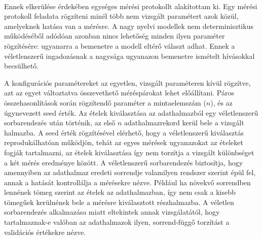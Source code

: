 \paragraph{}Ennek elkerülése érdekében egységes mérési protokollt alakítottam ki.
Egy mérési protokoll feladata rögzíteni minél több nem vizsgált paramétert azok közül,
amelyeknek hatása van a mérésre.
A nagy nyelvi modellek nem determinisztikus működéséből adódóan azonban nincs lehetőség
minden ilyen paraméter rögzítésére: ugyanarra a bemenetre a modell eltérő választ adhat.
Ennek a véletlenszerű ingadozásnak a nagysága ugyanazon bemenetre ismételt hívásokkal becsülhető.

A konfigurációs paramétereket az egyetlen, vizsgált paraméteren kívül rögzítve, azt az egyet változtatva
összevethető méréspárokat lehet előállítani.
Páros összehasonlítások során rögzítendő paraméter a mintaelemszám ($n$), és az úgynevezett
seed érték.
Az ételek kiválasztása az adathalmazból egy véletlenszerű sorbarendezés után történik,
az első $n$ adathalmazrekord kerül bele a vizsgált halmazba.
A seed érték rögzítésével elérhető, hogy a véletlenszerű kiválasztás reprodukálhatóan
működjön, tehát az egyes mérések ugyanazokat az ételeket fogják tartalmazni, az ételek kiválasztása
így nem torzítja a vizsgált különbséget a két mérés eredménye között.
A véletlenszerű sorbarendezés biztosítja, hogy amennyiben az adathalmaz eredeti sorrendje valamilyen rendszer
szerint épül fel, annak a hatását kontrollálja a mérésekre nézve.
Például ha növekvő sorrendben lennének tömeg szerint az ételek az adathalmazban, így nem csak a kisebb tömegűek kerülnének
bele a mérésre kiválasztott részhalmazba.
A véletlen sorbarendezés alkalmazása miatt eltekintek annak vizsgálatától, hogy tartalmaznak-e valóban az adathalmazok
ilyen, sorrend-függő torzítást a validációs értékekre nézve.

